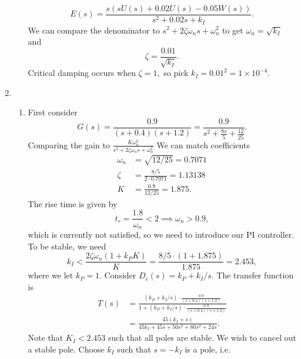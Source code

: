 \documentclass{article}
\numberwithin{equation}{section}
\begin{document}
\begin{enumerate}[label=\textbf{2.\arabic*}]
\begin{enumerate}[label=(\alph*)]
\begin{equation}
            E(s) = \frac{s (s U{(s)} + 0.02 U{(s)} - 0.05 W{(s)})}{s^{2} + 0.02 s + k_I}.
        \end{equation}
        We can compare the denominator to $s^2 + 2\zeta \omega_n s +\omega_n^2$ to get $\omega_n = \sqrt{k_I}$ and 
        \begin{equation}
            \zeta = \frac{0.01}{\sqrt{k_I}}.
        \end{equation}
        Critical damping occurs when $\zeta= 1,$ so pick $k_I = 0.01^2 = 1\times 10^{-4}.$
    \end{enumerate}
    \item \begin{enumerate}[label=(\alph*)]
        \item First consider 
        \begin{equation}
            G(s) = \frac{0.9}{(s+0.4)(s+1.2)} = \frac{0.9}{s^{2} + \frac{8 s}{5} + \frac{12}{25}}.
        \end{equation}
        Comparing the gain to $\frac{K\omega_n^2}{s^2 +2\zeta\omega_n s + \omega_n^2}$ We can match coefficients
        \begin{align}
            \omega_n &= \sqrt{12/25} = 0.7071 \\ 
            \zeta &= \frac{8/5}{2 \cdot 0.7071} = 1.13138 \\ 
            K &= \frac{0.9}{12/25} = 1.875.
        \end{align}
        The rise time is given by 
        \begin{equation}
            t_r = \frac{1.8}{\omega_n}  < 2 \implies \omega_n > 0.9,
        \end{equation}
        which is currently not satisfied, so we need to introduce our PI controller. To be stable, we need
        \begin{equation}
            k_I < \frac{2\zeta\omega_n(1+k_PK)}{K} = \frac{8/5 \cdot (1+1.875)}{1.875} = 2.453,
        \end{equation}
        where we let $k_P=1.$ Consider $D_c(s) = k_P + k_I/s.$ The transfer function is
        \begin{align}
            T(s) &= \frac{(k_P + k_I/s) \cdot \frac{0.9}{(s+0.4)(s+1.2)}}{1 + (k_P + k_I/s) \cdot \frac{0.9}{(s+0.4)(s+1.2)}} \\ 
            &= \frac{45 (k_{I} + s)}{45 k_{I} + 45 s + 50 s^{3} + 80 s^{2} + 24 s}.
        \end{align}
        Note that $K_I < 2.453$ such that all poles are stable. We wish to cancel out a stable pole. Choose $k_I$ such that $s=-k_I$ is a pole, i.e.

\end{enumerate}
\end{enumerate}
\end{document}
